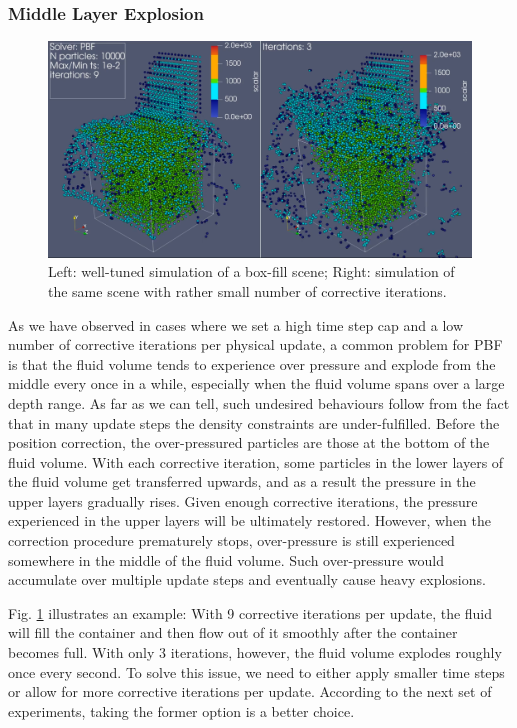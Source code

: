 \documentclass[
	11pt, 
	DIV10,
	ngerman,
	a4paper, 
	oneside, 
	headings=normal, 
	captions=tableheading,
	final, 
	numbers=noenddot
]{scrartcl}
\begin{document}
\subsubsection{Middle Layer Explosion}

\begin{figure}
    \centering
    \includegraphics[width=.6\textwidth]{pics/pbf_iter.png}
    \caption{Left: well-tuned simulation of a box-fill scene; Right: simulation of the same scene with rather small number of corrective iterations.}
    \label{fig:boxfill}
\end{figure}

As we have observed in cases where we set a high time step cap and a low number of corrective iterations per physical update, a common problem for PBF is that the fluid volume tends to experience over pressure and explode from the middle every once in a while, especially when the fluid volume spans over a large depth range. As far as we can tell, such undesired behaviours follow from the fact that in many update steps the density constraints are under-fulfilled. Before the position correction, the over-pressured particles are those at the bottom of the fluid volume. With each corrective iteration, some particles in the lower layers of the fluid volume get transferred upwards, and as a result the pressure in the upper layers gradually rises. Given enough corrective iterations, the pressure experienced in the upper layers will be ultimately restored. However, when the correction procedure prematurely stops, over-pressure is still experienced somewhere in the middle of the fluid volume. Such over-pressure would accumulate over multiple update steps and eventually cause heavy explosions.

Fig. \ref{fig:boxfill} illustrates an example: With 9 corrective iterations per update, the fluid will fill the container and then flow out of it smoothly after the container becomes full. With only 3 iterations, however, the fluid volume explodes roughly once every second. To solve this issue, we need to either apply smaller time steps or allow for more corrective iterations per update. According to the next set of experiments, taking the former option is a better choice.
\end{document}
